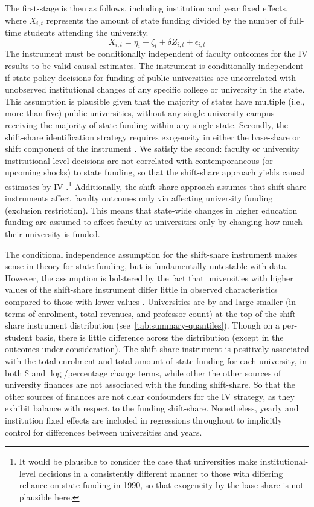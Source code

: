 The first-stage is then as follows, including institution and year fixed effects, where $X_{i,t}$ represents the amount of state funding divided by the number of full-time students attending the university.
\begin{equation}
    \label{eqn:firststage}
    X_{i,t} = \eta_i + \zeta_t + \delta Z_{i,t} + \epsilon_{i,t}
\end{equation}
The instrument must be conditionally independent of faculty outcomes for the IV results to be valid causal estimates.
The instrument is conditionally independent if state policy decisions for funding of public universities are uncorrelated with unobserved institutional changes of any specific college or university in the state.
This assumption is plausible given that the majority of states have multiple (i.e., more than five) public universities, without any single university campus receiving the majority of state funding within any single state.
Secondly, the shift-share identification strategy requires exogeneity in either the base-share or shift component of the instrument \citep{borusyak2022quasi}.
We satisfy the second: faculty or university institutional-level decisions are not correlated with contemporaneous (or upcoming shocks) to state funding, so that the shift-share approach yields causal estimates by IV \citep{NBERw27885}.\footnote{
    It would be plausible to consider the case that universities make institutional-level decisions in a consistently different manner to those with differing reliance on state funding in 1990, so that exogeneity by the base-share is not plausible here.
}
Additionally, the shift-share approach assumes that shift-share instruments affect faculty outcomes only via affecting university funding (exclusion restriction).
This means that state-wide changes in higher education funding are assumed to affect faculty at universities only by changing how much their university is funded.

The conditional independence assumption for the shift-share instrument makes sense in theory for state funding, but is fundamentally untestable with data.
However, the assumption is bolstered by the fact that universities with higher values of the shift-share instrument differ little in observed characteristics compared to those with lower values \citep{pei2019poorly}.
Universities are by and large smaller (in terms of enrolment, total revenues, and professor count) at the top of the shift-share instrument distribution (see~\autoref{tab:summary-quantiles}).
Though on a per-student basis, there is little difference across the distribution (except in the outcomes under consideration).
The shift-share instrument is positively associated with the total enrolment and total amount of state funding for each university, in both \$ and $\log$/percentage change terms, while other the other sources of university finances are not associated with the funding shift-share.
So that the other sources of finances are not clear confounders for the IV strategy, as they exhibit balance with respect to the funding shift-share.
Nonetheless, yearly and institution fixed effects are included in regressions throughout to implicitly control for differences between universities and years.

